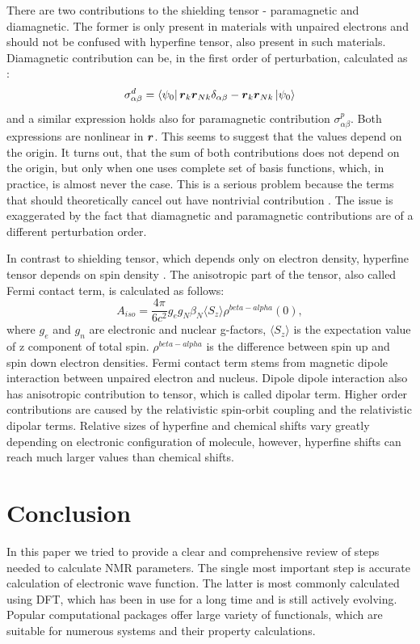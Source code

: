\documentclass[openany, longbibliography,slovene,a4paper,12pt]{article}
\def\vec#1{\mbox{\boldmath$#1$}}
\begin{document}
  There are two contributions to the shielding tensor - paramagnetic and
  diamagnetic. The former is only present in materials with unpaired electrons
  and should not be confused with hyperfine tensor, also present in such materials.
  Diamagnetic contribution can be, in the first order of perturbation, calculated as \cite{chemic_shift_tensor_review}:
  \begin{equation}
    \sigma^d_{\alpha \beta}=\bra{\psi_0}\vec{r}_k \vec{r}_{Nk}\delta_{\alpha\beta}- \vec{r}_{k}\vec{r}_{Nk} \ket{\psi_0}
  \end{equation}
  and a similar expression holds also for paramagnetic contribution $\sigma^p_{\alpha\beta}$. Both
  expressions are nonlinear in $\vec r$. This seems to suggest that the values
  depend on the origin. It turns out, that the sum of both contributions does
  not depend on the origin, but only when one uses complete set of basis functions,
  which, in practice, is almost never the case. This is a serious problem
  because the terms that should theoretically cancel out have nontrivial
  contribution \cite{chemic_shift_tensor_review}. The issue is exaggerated by
  the fact that diamagnetic and paramagnetic contributions are of a different
  perturbation order.

  In contrast to shielding tensor, which depends only on electron density,
  hyperfine tensor depends on spin density \cite{calcul_hyper_tensor_param_nmr}.
  The anisotropic part of the tensor, also called Fermi contact term, is
  calculated as follows:
  \begin{equation}
    A_{iso}=\frac{4\pi}{6c^2}g_eg_N\beta_N\langle S_z \rangle \rho^{beta-alpha}(0),
    \end{equation}
where $g_e$ and $g_n$ are electronic and nuclear g-factors, $\langle S_z
\rangle$ is the expectation value of z component of total spin.  $\rho^{beta-alpha}$ is the difference between spin up and spin
down electron densities. Fermi contact term stems from magnetic dipole
interaction between unpaired electron and nucleus. Dipole dipole interaction
also has anisotropic contribution to tensor, which is called dipolar term. Higher
order contributions are caused by the relativistic spin-orbit coupling and
the relativistic dipolar terms.
Relative sizes of hyperfine and chemical shifts vary greatly depending on
electronic configuration of molecule, however,
hyperfine shifts can reach much larger values than chemical shifts. 

\section{Conclusion}
In this paper we tried to provide a clear and comprehensive review of steps needed
to calculate NMR parameters. The single most important step is accurate
calculation of electronic wave function. The latter is most commonly calculated
using DFT, which has been in use for a long time and is still actively evolving.
Popular computational packages offer large variety of functionals, which are
suitable for numerous systems and their property calculations. 

\newpage {}




\end{document}
